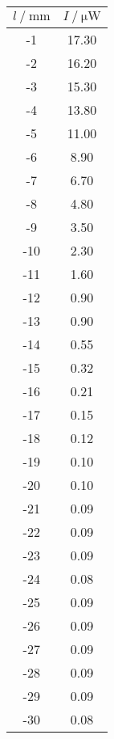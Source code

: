 \begin{table}
\begin{tabular}[t]{S S}
        \bottomrule
    \end{tabular}
    \begin{tabular}[t]{S S}
        \toprule
        $l \mathbin{/} \si{\milli\m}$ & $I \mathbin{/} \si{\micro\watt}$ \\
        \midrule

        -1 & 17.30  \\
        -2 & 16.20  \\
        -3 & 15.30  \\
        -4 & 13.80  \\
        -5 & 11.00  \\
        -6 & 8.90   \\
        -7 & 6.70   \\
        -8 & 4.80   \\
        -9 & 3.50   \\
        -10 & 2.30  \\
        -11 & 1.60  \\
        -12 & 0.90  \\
        -13 & 0.90  \\
        -14 & 0.55  \\
        -15 & 0.32  \\
        -16 & 0.21  \\
        -17 & 0.15  \\
        -18 & 0.12  \\
        -19 & 0.10  \\
        -20 & 0.10  \\
        -21 & 0.09  \\
        -22 & 0.09  \\
        -23 & 0.09  \\
        -24 & 0.08  \\
        -25 & 0.09  \\
        -26 & 0.09  \\
        -27 & 0.09  \\
        -28 & 0.09  \\
        -29 & 0.09  \\
        -30 & 0.08  \\

        \bottomrule

    \end{tabular}
\end{table}



